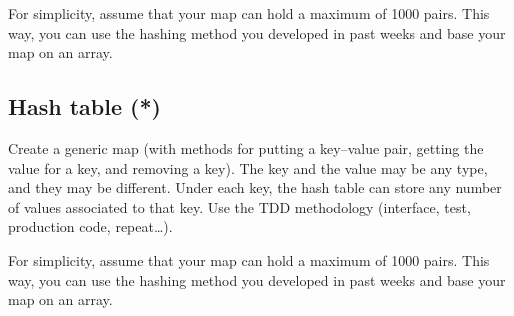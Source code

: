 \documentclass{article}
\begin{document}
For simplicity, assume that your map can hold a maximum of 1000
pairs. This way, you can use the hashing method you developed in past
weeks and base your map on an array. 

\subsection{Hash table (*)}
\label{sec:array-based-impl}

Create a generic map (with methods for putting a key--value pair,
getting the value for a key, and removing a key). The key and the
value may be any type, and they may be different. Under each key, the
hash table can store any number of values associated to that key. 
Use the TDD methodology
(interface, test, production code, repeat\ldots).

For simplicity, assume that your map can hold a maximum of 1000
pairs. This way, you can use the hashing method you developed in past
weeks and base your map on an array. 
\end{document}

